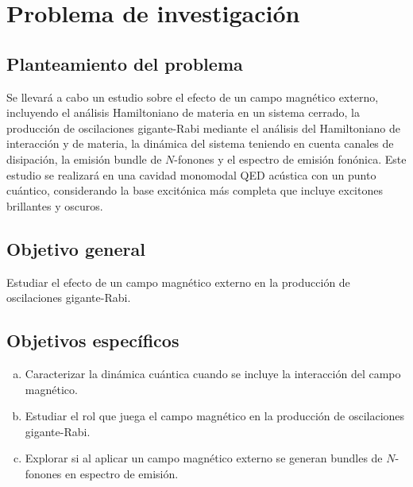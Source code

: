 \documentclass[main.tex]{subfiles}
\begin{document}
\chapter{Problema de investigación}
\section{Planteamiento del problema}
Se llevará a cabo un estudio sobre el efecto de un campo magnético externo, incluyendo el análisis Hamiltoniano de materia en un sistema cerrado, la producción de oscilaciones gigante-Rabi mediante el análisis del Hamiltoniano de interacción y de materia, la dinámica del sistema teniendo en cuenta canales de disipación, la emisión bundle de $N$-fonones y el espectro de emisión fonónica. Este estudio se realizará en una cavidad monomodal QED acústica con un punto cuántico, considerando la base excitónica más completa que incluye excitones brillantes y oscuros.

\section{Objetivo general}
Estudiar el efecto de un campo magnético externo en la producción de oscilaciones gigante-Rabi.
\section{Objetivos específicos}
\begin{enumerate}[(a)]
	\item Caracterizar la din\'amica cu\'antica cuando se incluye la interacción del campo magnético.
	\item Estudiar el rol que juega el campo magnético en la producción de oscilaciones gigante-Rabi.
	\item Explorar si al aplicar un campo magnético externo se generan bundles de $N$-fonones en espectro de emisi\'on.
\end{enumerate}
\end{document}
